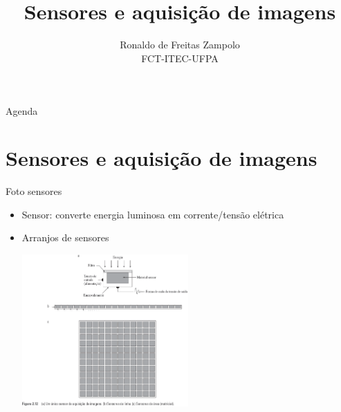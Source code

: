 


\title{\cursogrande\\ \vspace{1cm}Sensores e aquisição de imagens}
\author{Ronaldo de Freitas Zampolo\\FCT-ITEC-UFPA}


   \maketitle[randomdots={false}]
   \begin{slide}{Agenda}
      \tableofcontents[content=sections]
   \end{slide}

\section[ slide = true ]{Sensores e aquisição de imagens}
   \begin{slide}[toc=]{Foto sensores}
      \begin{itemize}[type=1]
         \item Sensor: converte energia luminosa em corrente/tensão elétrica
         \item Arranjos de sensores
         \begin{center}
               \includegraphics[width=0.5\textwidth]{figs/fig0212}
            \end{center}
      \end{itemize}
   \end{slide}

